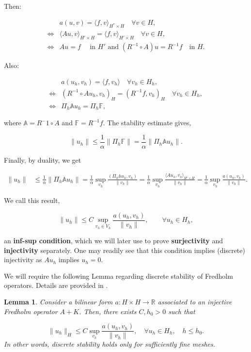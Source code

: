 \documentclass{article}
\newcommand{\R}{\mathbb{R}}
\newtheorem{lemma}{Lemma}
\begin{document}
Then:

\begin{align*}
    &a(u,v) = \langle f, v\rangle_{H^*\times H}\quad \forall v\in H,\\
    \iff &\langle Au, v\rangle_{H'\times H} = \langle f, v\rangle_{H'\times H}\quad \forall v\in H,\\
    \iff &Au = f \quad\text{ in $H'$ and }(R^{-1}\circ A)u = R^{-1}f\quad\text{in }H.
\end{align*}

Also:

\begin{align*}
    &a(u_h,v_h) = \langle f, v_h\rangle\quad\forall v_h\in H_h,\\
    \iff &(R^{-1}\circ A u_h,v_h)_H = (R^{-1}f,v_h)_H\quad\forall v_h\in H_h,\\
    \iff &\Pi_h\mathbb{A}u_h = \Pi_h\mathbb{F},
\end{align*}

where $\mathbb{A} = R^-1\circ A$ and $\mathbb{F} = R^{-1}f$. The stability estimate gives, 

\[\|u_h\| \leq\frac{1}{\alpha}\|\Pi_h\mathbb{F}\| = \frac{1}{\alpha}\|\Pi_h\mathbb{A} u_h\|.\]

Finally, by duality, we get

\begin{align*}
    \|u_h\| &\leq \frac{1}{\alpha}\|\Pi_h\mathbb{A}u_h\| = \frac{1}{\alpha}\sup_{v_h}\frac{(\Pi_h\mathbb{A}u_h,v_h)}{\|v_h\|}
    =\frac{1}{\alpha}\sup_{v_h}\frac{\langle Au_h,v_h\rangle_{H'\times H}}{\|v_h\|} = \frac{1}{\alpha}\sup_{v_h}\frac{a(u_h,v_h)}{\|v_h\|}.
\end{align*}

We call this result,

\[\|u_h\| \leq C\sup_{v_h\in V_h}\frac{a(u_h,v_h)}{\|v_h\|},\qquad \forall u_h\in H_h,\]

an \textbf{inf-sup condition}, which we will later use to prove \textbf{surjectivity} and \textbf{injectivity} separately. One may readily see that this condition implies (discrete) injectivity as $Au_h$ implies $u_h = 0$.

We will require the following Lemma regarding discrete stability of Fredholm operators. Details are provided in \cite{sayas2019variational}.
\begin{lemma}
Consider a bilinear form $a:H\times H\to \R$ associated to an injective Fredholm operator $A+K$. Then, there exists $C, h_0>0$ such that

\[\|u_h\|_H\leq C\sup_{v_h}\frac{a(u_h,v_h)}{\|v_h\|},\quad \forall u_h\in H_h, \quad h\leq h_0.\]
In other words, discrete stability holds only for sufficiently fine meshes. 
\end{lemma}
\end{document}
